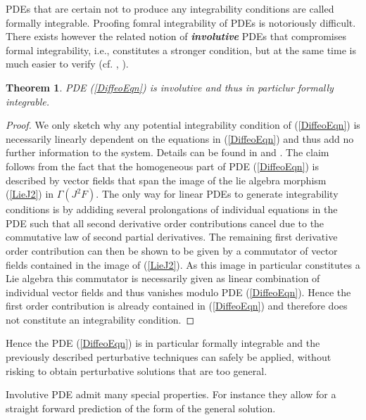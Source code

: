 \documentclass[%
 reprint,
nofootinbib,
 amsmath,amssymb,
 aps,
 prd,
floatfix,
]{revtex4-2}
\newtheorem{theorem}{Theorem}
\begin{document}
PDEs that are certain not to produce any integrability conditions are called formally integrable.
Proofing fomral integrability of PDEs is notoriously difficult. There exists however the related notion of \textit{\textbf{involutive}} PDEs that compromises formal integrability, i.e., constitutes a stronger condition, but at the same time is much easier to verify (cf. \cite{seiler2009involution}, \cite{seiler1994analysis}).  
\begin{theorem}
PDE (\ref{DiffeoEqn}) is involutive and thus in particlur formally integrable.
\end{theorem}
\begin{proof}
We only sketch why any potential integrability condition of (\ref{DiffeoEqn}) is necessarily linearly dependent on the equations in  (\ref{DiffeoEqn}) and thus add no further information to the system.
Details can be found in \cite{seiler1994analysis} and \cite{TobiMaster}.
The claim follows from the fact that the homogeneous part of PDE (\ref{DiffeoEqn}) is described by vector fields that span the image of the lie algebra morphism (\ref{LieJ2}) in $\Gamma(J^2F)$. The only way for linear PDEs to generate integrability conditions is by addiding several prolongations of individual equations in the PDE such that all second derivative order contributions cancel due to the commutative law of second partial derivatives. The remaining first derivative order contribution can then be shown to be given by a commutator of vector fields contained in the image of (\ref{LieJ2}). As this image in particular constitutes a Lie algebra this commutator is necessarily given as linear combination of individual vector fields and thus vanishes modulo PDE (\ref{DiffeoEqn}). Hence the first order contribution is already contained in (\ref{DiffeoEqn}) and therefore does not constitute an integrability condition. 
\end{proof}
Hence the PDE (\ref{DiffeoEqn}) is in particular formally integrable and the previously described perturbative techniques can safely be applied, without risking to obtain perturbative solutions that are too general. 

Involutive PDE admit many special properties. For instance they allow for a straight forward prediction of the form of the general solution.
\end{document}
